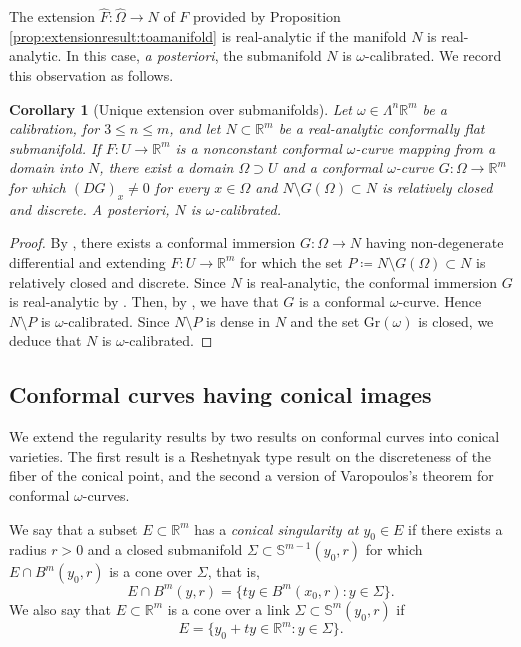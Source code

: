 \documentclass[a4paper,leqno,11pt]{amsart}
\numberwithin{equation}{section}
\newtheorem{corollary}[theorem]{Corollary}
\theoremstyle{remark}
\theoremstyle{remark}
\newcommand{\R}{\mathbb{R}}
\newcommand{\bS}{\mathbb{S}}
\newcommand{\Gr}{\mathrm{Gr}}
\begin{document}
The extension $\hat F\colon \hat \Omega \to N$ of $F$ provided by Proposition \ref{prop:extensionresult:toamanifold} is real-analytic if the manifold $N$ is real-analytic. In this case, \emph{a posteriori}, the submanifold $N$ is $\omega$-calibrated. We record this observation as follows.

\begin{corollary}[Unique extension over submanifolds]\label{cor:uniquecont:manif}
Let $\omega \in \Lambda^{n}\mathbb{R}^m$ be a calibration,  for $3\le n \le m$, and let $N \subset \mathbb{R}^m$ be a real-analytic conformally flat submanifold. If $F \colon U \to \mathbb{R}^m$ is a nonconstant conformal $\omega$-curve mapping from a domain into $N$, there exist a domain $\Omega \supset U$ and a conformal $\omega$-curve $G \colon \Omega \to \R^m$ for which $( DG )_x \neq 0$ for every $x \in \Omega$ and $N \setminus G(\Omega) \subset N$ is relatively closed and discrete. A posteriori, $N$ is $\omega$-calibrated.
\end{corollary}

\begin{proof}
By , there exists a conformal immersion $G \colon \Omega \to N$ having non-degenerate differential and extending $F \colon U \to \R^m$ for which the set $P \coloneqq N \setminus G(\Omega) \subset N$ is relatively closed and discrete. Since $N$ is real-analytic, the conformal immersion $G$ is real-analytic by \cite[Proposition A.3]{Las:Lii:Sal:22}. Then, by , we have that $G$ is a conformal $\omega$-curve. Hence $N \setminus P$ is $\omega$-calibrated. Since $N \setminus P$ is dense in $N$ and the set $\Gr( \omega )$ is closed, we deduce that $N$ is $\omega$-calibrated.
\end{proof}




\subsection{Conformal curves having conical images}
\label{sec:conical-singularities}

We extend the regularity results by two results on conformal curves into conical varieties. The first result is a Reshetnyak type result on the discreteness of the fiber of the conical point, and the second a version of Varopoulos's theorem for conformal $\omega$-curves. 


We say that a subset $E\subset \R^m$ has a \emph{conical singularity at $y_0\in E$} if there exists a radius $r>0$ and a closed submanifold $\Sigma \subset \bS^{m-1}(y_0,r)$ for which $E\cap B^m(y_0,r)$ is a cone over $\Sigma$, that is,
\[
E \cap B^m(y,r) = \{ ty \in B^m(x_0,r) \colon y\in \Sigma\}.
\]
We also say that $E \subset \R^m$ is a cone over a link $\Sigma \subset \bS^m(y_0,r)$ if 
\[
E= \{ y_0 + ty \in \R^m \colon y\in \Sigma\}.
\]
\end{document}
